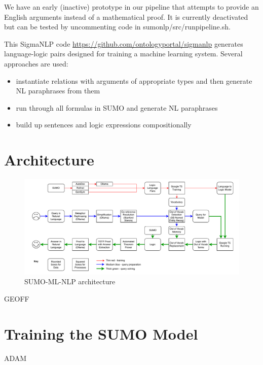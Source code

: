 \documentclass[runningheads]{llncs}
\begin{document}
We have an early (inactive) prototype in our pipeline that attempts to provide an English arguments instead of a mathematical proof.  It is currently deactivated but can be tested by uncommenting code in sumonlp/src/runpipeline.sh.

This SigmaNLP code \url{https://github.com/ontologyportal/sigmanlp}
generates language-logic pairs designed for training a machine learning system. Several approaches are used:

\begin{itemize}
\item instantiate relations with arguments of appropriate types and then generate NL paraphrases from them
\item run through all formulas in SUMO and generate NL paraphrases
\item build up sentences and logic expressions compositionally
\end{itemize}

\section{Architecture}
\label{Architecture}

\begin{figure}
\includegraphics[width=\textwidth]{Architecture.pdf}
\caption{SUMO-ML-NLP architecture}
\label{ArchitecturePicture}
\end{figure}

GEOFF

\section{Training the SUMO Model}
\label{Training}

ADAM
\end{document}
